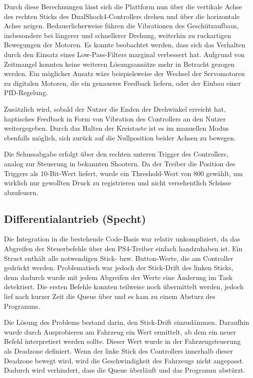 Durch diese Berechnungen lässt sich die Plattform nun über die vertikale Achse des rechten Sticks des DualShock4-Controllers drehen und über die horizontale Achse neigen. 
Bedauerlicherweise führen die Vibrationen des Geschützaufbaus, insbesondere bei längerer und schnellerer Drehung, weiterhin zu ruckartigen Bewegungen der Motoren. 
Es konnte beobachtet werden, dass sich das Verhalten durch den Einsatz eines Low-Pass-Filters marginal verbessert hat. Aufgrund von Zeitmangel konnten keine weiteren Lösungsansätze mehr in Betracht gezogen werden. 
Ein möglicher Ansatz wäre beispielsweise der Wechsel der Servomotoren zu digitalen Motoren, die ein genaueres Feedback liefern, oder der Einbau einer PID-Regelung.

Zusätzlich wird, sobald der Nutzer die Enden der Drehwinkel erreicht hat, haptisches Feedback in Form von Vibration des Controllers an den Nutzer weitergegeben. 
Durch das Halten der Kreistaste ist es im manuellen Modus ebenfalls möglich, sich zurück auf die Nullposition beider Achsen zu bewegen.

Die Schussabgabe erfolgt über den rechten unteren Trigger des Controllers, analog zur Steuerung in bekannten Shootern. 
Da der Treiber die Position des Triggers als 10-Bit-Wert liefert, wurde ein Threshold-Wert von 800 gewählt, um wirklich nur gewollten Druck zu registrieren und nicht versehentlich Schüsse abzufeuern.

\subsection{Differentialantrieb (Specht)} \label{sec:diff_drive_integration}

Die Integration in die bestehende Code-Basis war relativ unkompliziert, da das Abgreifen der Steuerbefehle über den PS4-Treiber einfach handzuhaben ist. Ein Struct enthält alle notwendigen Stick- bzw. Button-Werte, die am Controller gedrückt werden. Problematisch war jedoch der Stick-Drift des linken Sticks, denn dadurch wurde mit jedem Abgreifen der Werte eine Änderung im Task detektiert. Die ersten Befehle konnten teilweise noch übermittelt werden, jedoch lief nach kurzer Zeit die Queue über und es kam zu einem Absturz des Programms. \newline

Die Lösung des Problems bestand darin, den Stick-Drift einzudämmen. Daraufhin wurde durch Ausprobieren am Fahrzeug ein Wert ermittelt, ab dem ein neuer Befehl interpretiert werden sollte. Dieser Wert wurde in der Fahrzeugsteuerung als Deadzone definiert. Wenn der linke Stick des Controllers innerhalb dieser Deadzone bewegt wird, wird die Geschwindigkeit des Fahrzeugs nicht angepasst. Dadurch wird verhindert, dass die Queue überläuft und das Programm abstürzt. \newline

